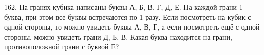 162. На гранях кубика написаны буквы А, Б, В, Г, Д, Е. На каждой грани 1 буква, при этом все буквы встречаются по 1 разу. Если посмотреть на кубик с одной стороны, то можно увидеть буквы А, В, Г, а если посмотреть ещё с одной стороны, можно увидеть грани Д, Б, В. Какая буква находится на грани, противоположной грани с буквой Е?\\

